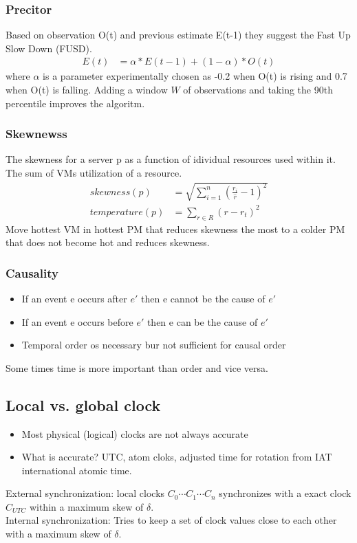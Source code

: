 \documentclass[course, english]{Notes}
\begin{document}
\subsubsection{Precitor}
Based on observation O(t) and previous estimate E(t-1) they suggest the Fast Up
Slow Down (FUSD).
\begin{align*}
	E(t) &= \alpha * E(t-1) + (1-\alpha)*O(t)
\end{align*}
where $\alpha$ is a parameter experimentally chosen as -0.2 when O(t) is rising
and 0.7 when O(t) is falling. Adding a window $W$ of observations and taking the
90th percentile improves the algoritm.

\subsubsection{Skewnewss}
The skewness for a server p as a function of idividual resources used within it.
The sum of VMs utilization of a resource.
\begin{align}
	skewness(p) &=\sqrt{\sum^{n}_{i=1}\left(\frac{r_i}{\hat{r}}-1\right)^2} \\
	temperature(p) &= \sum_{r \in R}(r-r_t)^2
\end{align}
Move hottest VM in hottest PM that reduces skewness the most to a colder PM that
does not become hot and reduces skewness.\\
\subsubsection{Causality}
\begin{itemize}
	\item If an event e occurs after $e'$ then e cannot be the cause of
		$e'$
	\item If an event e occurs before $e'$ then e can be the cause of
		$e'$
	\item Temporal order os necessary bur not sufficient for causal order
\end{itemize}
Some times time is more important than order and vice versa.

\subsection{Local vs. global clock}
\begin{itemize}
	\item Most physical (logical) clocks are not always accurate
	\item What is accurate? UTC, atom cloks, adjusted time for rotation from
		IAT international atomic time.
\end{itemize}
External synchronization: local clocks $C_0\cdots C_1 \cdots C_n$ synchronizes
with a exact clock $C_{UTC}$ within a maximum skew of $\delta$.\\
Internal synchronization: Tries to keep a set of clock values close to each
other with a maximum skew of $\delta$.
\end{document}
